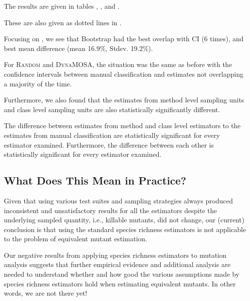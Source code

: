 \documentclass[sigconf,review,anonymous]{acmart}
\newcommand{\EvosuiteRandom}{\textsc{Random}\xspace}
\newcommand{\EvosuiteDynamosa}{\textsc{DynaMOSA}\xspace}
\begin{document}
The results are given in tables ,
, and .

These are also given as dotted lines in .

Focusing on , we see that Bootstrap had the best
overlap with CI (6 times), and best mean difference (mean 16.9\%, Stdev. 19.2\%).

For \EvosuiteRandom and \EvosuiteDynamosa, the situation was the same as before
with the confidence intervals between manual classification and estimates not
overlapping a majority of the time.

Furthermore, we also found that the estimates from method level sampling units
and class level sampling units are also statistically significantly different.

\begin{tcolorbox}[boxrule=0.5pt, arc=4pt, boxsep=0pt, width=\columnwidth]
The difference between estimates from method and class level
estimators to the estimates from manual classification are statistically
significant for every estimator examined. Furthermore, the difference between
each other is statistically significant for every estimator examined.
\end{tcolorbox}

\subsection{What Does This Mean in Practice?}

Given that using various test suites and sampling strategies always produced inconsistent and
unsatisfactory results for all the estimators despite the underlying sampled quantity, i.e., killable
mutants, did not change, our (current) conclusion is that using the standard species richness estimators
is not applicable to the problem of equivalent mutant estimation.

Our negative results from applying species richness estimators to mutation analysis
suggests that further empirical evidence and additional analysis are
needed to understand whether and how good the various assumptions made by species richness estimators
hold when estimating equivalent mutants. 
%
In other words, we are not there yet!

\end{document}
